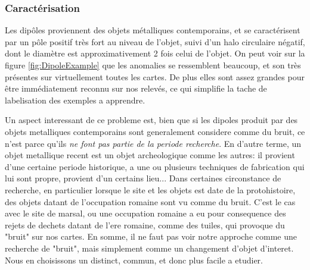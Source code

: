 \documentclass[a4paper, 12pt, titlepage, oneside, french]{article}
\begin{document}
	\subsubsection{Caractérisation}
	Les dipôles proviennent des objets métalliques contemporains, et se caractérisent par un pôle positif très fort au niveau de l'objet, suivi d'un halo circulaire négatif, dont le diamètre est approximativement 2 fois celui de l'objet. On peut voir sur la figure \ref{fig:DipoleExample} que les anomalies se ressemblent beaucoup, et son très présentes sur virtuellement toutes les cartes. De plus elles sont assez grandes pour être immédiatement reconnu sur nos relevés, ce qui simplifie la tache de labelisation des exemples a apprendre. 

Un aspect interessant de ce probleme est, bien que si les dipoles produit par des objets metalliques contemporains sont generalement considere comme du bruit, ce n'est parce qu'ils \textit{ne font pas partie de la periode recherche}. En d'autre terme, un objet metallique recent est un objet archeologique comme les autres: il provient d'une certaine periode historique, a une ou plusieurs techniques de fabrication qui lui sont propre, provient d'un certains lieu... Dans certaines circonstance de recherche, en particulier lorsque le site et les objets est date de la protohistoire, des objets datant de l'occupation romaine sont vu comme du bruit. C'est le cas avec le site de marsal, ou une occupation romaine a eu pour consequence des rejets de dechets datant de l'ere romaine, comme des tuiles, qui provoque du "bruit" sur nos cartes. En somme, il ne faut pas voir notre approche comme une recherche de "bruit", mais simplement comme un changement d'objet d'interet. Nous en choisissons un distinct, commun, et donc plus facile a etudier.
\end{document}
